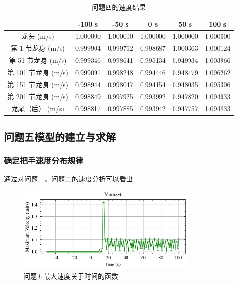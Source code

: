 \documentclass[a4paper]{article}
\begin{document}
		\begin{table}[H] %
			\captionsetup{skip=4pt} %
			\caption{问题四的速度结果}
			\centering
			\setlength{\arrayrulewidth}{0.5pt} %
			\begin{tabular}{|c|c|c|c|c|c|} %
				\hline
				& -100 s & -50 s & 0 s & 50 s & 100 s \\ \hline
				龙头 (m/s)          & 1.000000 & 1.000000 & 1.000000 & 1.000000 & 1.000000 \\ \hline
				第 1 节龙身 (m/s)   & 0.999904 & 0.999762 & 0.998687 & 1.000363 & 1.000124 \\ \hline
				第 51 节龙身 (m/s)  & 0.999346 & 0.998641 & 0.995134 & 0.949934 & 1.003966 \\ \hline
				第 101 节龙身 (m/s) & 0.999091 & 0.998248 & 0.994446 & 0.948479 & 1.096262 \\ \hline
				第 151 节龙身 (m/s) & 0.998944 & 0.998047 & 0.994154 & 0.948035 & 1.095306 \\ \hline
				第 201 节龙身 (m/s) & 0.998849 & 0.997925 & 0.993992 & 0.947820 & 1.094933 \\ \hline
				龙尾（后） (m/s)    & 0.998817 & 0.997885 & 0.993942 & 0.947757 & 1.094833 \\ \hline
			\end{tabular}
		\end{table}
	
	\subsection{问题五模型的建立与求解}
	
	\subsubsection{确定把手速度分布规律}
		
		通过对问题一、问题二的速度分析可以看出 %
	
		\begin{figure}[H]
			\centering
			\includegraphics[width=0.8\textwidth]{image/Figure_5511.png}
			\caption{问题五最大速度关于时间的函数}
			\label{Figure_5511}
		\end{figure}
	
\end{document}
